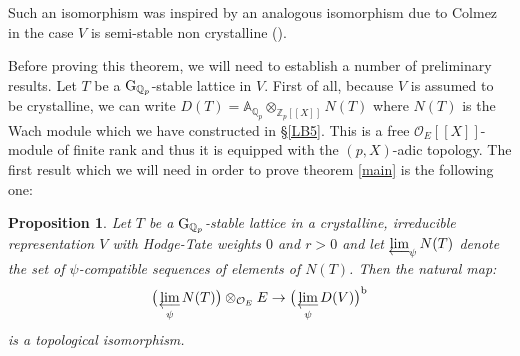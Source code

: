\documentclass[11pt]{amsart}
\def\limproj{\mathop{\oalign{{\rm lim}\cr 
\hidewidth$\longleftarrow$\hidewidth\cr}}}
\def\Z{{\mathbb Z}_p}
\def\Q{{\mathbb Q}_p}
\def\g{{\rm G}_{\Q}}
\def\O{{\mathcal O}_E}
\def\aa{\mathbb{A}}
\newtheorem{prop}[definit]{\bf{Proposition}}
\begin{document}
Such an isomorphism was inspired by an analogous isomorphism due to
Colmez in the case $V$ is semi-stable non crystalline (\cite{Co3}). 
 
Before proving this theorem, we will need to establish a number of 
preliminary results. Let $T$ be a $\g$-stable lattice in $V$. 
First of all, because $V$ is assumed to be 
crystalline, we can write $D(T) = \aa_{\Q} \otimes_{\Z[[X]]} N(T)$ 
where $N(T)$ is the Wach module which we have constructed in 
\S\ref{LB5}. This is a free $\O[[X]]$-module of finite rank and thus it 
is equipped with the $(p,X)$-adic topology. The first result which we 
will need in order to prove theorem \ref{main} is the following one: 
 
\begin{prop}  
Let $T$ be a $\g$-stable lattice in a crystalline,  
irreducible representation $V$ with Hodge-Tate weights  
$0$ and $r>0$ and let $\limproj_{\psi}N(T)$ denote  
the set of $\psi$-compatible sequences of elements  
of $N(T)$. Then the natural map:  
$$\big(\limproj_{\psi}N(T)\big) \otimes_{\O}E\rightarrow  
\big(\limproj_{\psi}D(V)\big)^{\rm b}$$ 
is a topological isomorphism. 
\end{prop} 
\end{document}
